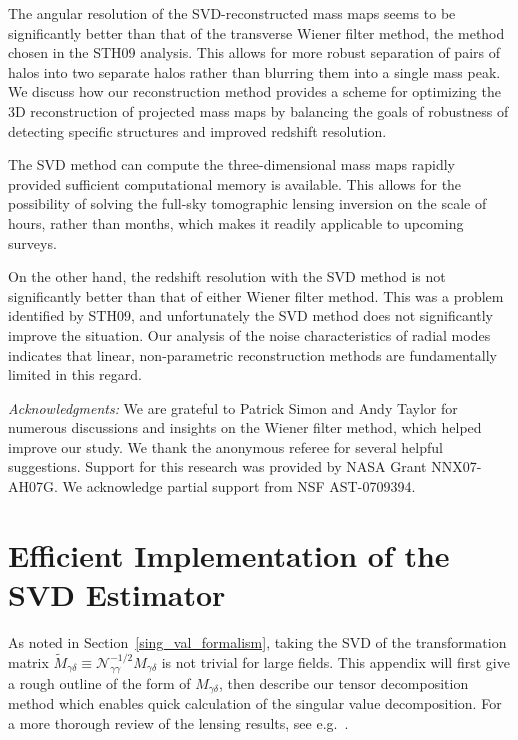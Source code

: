 \documentclass[twocolumn]{emulateapj}
\begin{document}
The angular resolution of the SVD-reconstructed mass maps seems to 
be significantly better than that of the transverse Wiener filter method,
the method chosen in the STH09 analysis.
This allows for more robust separation of pairs of halos into two 
separate halos rather than blurring them into a single mass peak.  
We discuss how our reconstruction method provides a scheme for
optimizing the 3D reconstruction of projected mass maps by
balancing the goals of robustness of detecting specific structures
and improved redshift resolution. 

The SVD method can compute the three-dimensional mass maps
rapidly provided sufficient computational memory is available. 
This allows for the possibility of solving the full-sky tomographic
lensing inversion on the scale of hours, rather than months, which
makes it readily applicable to upcoming surveys. 

On the other hand, the redshift resolution with the SVD method is not
significantly  better than that of either Wiener filter method.  
This was a problem identified by STH09, and unfortunately
the SVD method does not significantly improve the situation. 
Our analysis of the noise characteristics of radial modes 
indicates that linear, non-parametric reconstruction methods are
fundamentally limited in this regard.

{\it Acknowledgments:} We are grateful to Patrick Simon and Andy
Taylor for numerous discussions and insights on the Wiener filter method, 
which helped improve our study.  We thank the anonymous referee for
several helpful suggestions.
Support for this research was provided by NASA Grant NNX07-AH07G.
We acknowledge partial support from NSF AST-0709394.




\appendix
\section{Efficient Implementation of the SVD Estimator}
\label{app}
As noted in Section~\ref{sing_val_formalism}, taking the SVD of the 
transformation matrix $\widetilde{M}_{\gamma\delta} \equiv 
\mathcal{N}_{\gamma\gamma}^{-1/2}M_{\gamma\delta}$
is not trivial for large fields.  This appendix will first give a rough
outline of the form of $M_{\gamma\delta}$, then describe our tensor 
decomposition method which enables quick calculation of the singular
value decomposition.  For a more thorough review of the lensing results, 
see e.g.~\citet{Bartelmann01}.
\end{document}

